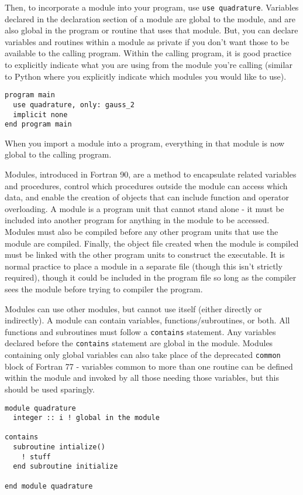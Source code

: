 \documentclass[10pt]{article}
\begin{document}
Then, to incorporate a module into your program, use {\tt use quadrature}. Variables declared in the declaration section of a module are global to the module, and are also global in the program or routine that uses that module. But, you can declare variables and routines within a module as private if you don't want those to be available to the calling program. Within the calling program, it is good practice to explicitly indicate what you are using from the module you're calling (similar to Python where you explicitly indicate which modules you would like to use). 

\begin{lstlisting}
program main
  use quadrature, only: gauss_2
  implicit none
end program main
\end{lstlisting}

When you import a module into a program, everything in that module is now global to the calling program. 

Modules, introduced in Fortran 90, are a method to encapsulate related variables and procedures, control which procedures outside the module can access which data, and enable the creation of objects that can include function and operator overloading. A module is a program unit that cannot stand alone - it must be included into another program for anything in the module to be accessed. Modules must also be compiled before any other program units that use the module are compiled. Finally, the object file created when the module is compiled must be linked with the other program units to construct the executable. It is normal practice to place a module in a separate file (though this isn't strictly required), though it could be included in the program file so long as the compiler sees the module before trying to compiler the program. 

Modules can use other modules, but cannot use itself (either directly or indirectly). A module can contain variables, functions/subroutines, or both. All functions and subroutines must follow a {\tt contains} statement. Any variables declared before the {\tt contains} statement are global in the module. Modules containing only global variables can also take place of the deprecated {\tt common} block of Fortran 77 - variables common to more than one routine can be defined within the module and invoked by all those needing those variables, but this should be used sparingly. 

\begin{lstlisting}
module quadrature
  integer :: i ! global in the module
  
contains
  subroutine intialize()
    ! stuff
  end subroutine initialize
  
end module quadrature
\end{lstlisting}
\end{document}

